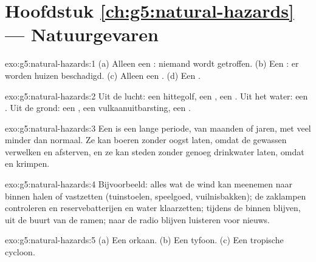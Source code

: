 \section*{Hoofdstuk \ref{ch:g5:natural-hazards} --- Natuurgevaren}

\begin{solution}{exo:g5:natural-hazards:1}
(a) Alleen een : niemand wordt getroffen. (b) Een :
er worden huizen beschadigd. (c) Alleen een . (d) Een
.
\end{solution}

\begin{solution}{exo:g5:natural-hazards:2}
Uit de lucht: een hittegolf, een , een . Uit het water: een
. Uit de grond: een , een vulkaanuitbarsting,
een .
\end{solution}

\begin{solution}{exo:g5:natural-hazards:3}
Een  is een lange periode, van maanden of jaren, met veel minder
 dan normaal. Ze kan boeren zonder oogst laten, omdat de gewassen
verwelken en afsterven, en ze kan steden zonder genoeg drinkwater laten,
omdat  en  krimpen.
\end{solution}

\begin{solution}{exo:g5:natural-hazards:4}
Bijvoorbeeld: alles wat de wind kan meenemen naar binnen halen of
vastzetten (tuinstoelen, speelgoed, vuilnisbakken); de zaklampen
controleren en reservebatterijen en water klaarzetten; tijdens de 
binnen blijven, uit de buurt van de ramen; naar de radio blijven luisteren
voor nieuws.
\end{solution}

\begin{solution}{exo:g5:natural-hazards:5}
(a) Een orkaan. (b) Een tyfoon. (c) Een tropische cycloon.
\end{solution}

